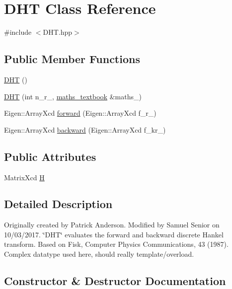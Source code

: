 \hypertarget{class_d_h_t}{}\section{D\+HT Class Reference}
\label{class_d_h_t}


{\ttfamily \#include $<$D\+H\+T.\+hpp$>$}

\subsection*{Public Member Functions}
\begin{DoxyCompactItemize}
\item 
\mbox{\hyperlink{class_d_h_t_addc81efbe31ac923b054636f675a2d8b}{D\+HT}} ()
\item 
\mbox{\hyperlink{class_d_h_t_a9f6e442f2bc6f1e2f5d2dd2a3f9a557d}{D\+HT}} (int n\+\_\+r\+\_\+, \mbox{\hyperlink{classmaths__textbook}{maths\+\_\+textbook}} \&maths\+\_\+)
\item 
Eigen\+::\+Array\+Xcd \mbox{\hyperlink{class_d_h_t_a916089f65c6ad05eace5e1f9854f50f4}{forward}} (Eigen\+::\+Array\+Xcd f\+\_\+r\+\_\+)
\item 
Eigen\+::\+Array\+Xcd \mbox{\hyperlink{class_d_h_t_a923f3d375e55f2dbdab2763de372f440}{backward}} (Eigen\+::\+Array\+Xcd f\+\_\+kr\+\_\+)
\end{DoxyCompactItemize}
\subsection*{Public Attributes}
\begin{DoxyCompactItemize}
\item 
Matrix\+Xcd \mbox{\hyperlink{class_d_h_t_ac17a580b606f25c937dbdc81dba517d7}{H}}
\end{DoxyCompactItemize}


\subsection{Detailed Description}
Originally created by Patrick Anderson. Modified by Samuel Senior on 10/03/2017. \char`\"{}\+D\+H\+T\char`\"{} evaluates the forward and backward discrete Hankel transform. Based on Fisk, Computer Physics Communications, 43 (1987). Complex datatype used here, should really template/overload. 

\subsection{Constructor \& Destructor Documentation}
\mbox{\label{class_d_h_t_addc81efbe31ac923b054636f675a2d8b}} 
